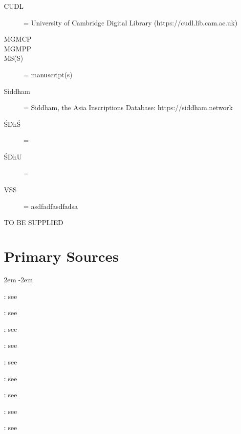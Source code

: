 \documentclass[11pt]{book}
\begin{document}
\begin{description}

\item[CUDL] = University of Cambridge Digital Library  
  (https://cudl.lib.cam.ac.uk)
  
\item[\fol]

\item[\fols]

\item[MGMCP]

\item[MGMPP]

\item[MS(S)] = manuscript(s)

\item[Siddham] = Siddham, the Asia Inscriptions Database:
https://siddham.network 

\item[ŚDhŚ] = \SDhS

\item[ŚDhU] = \SDhU
  
\item[VSS] = asdfadfasdfadsa
  
\end{description}


TO BE SUPPLIED

\vfill
\pagebreak



\section{Primary Sources}

\leftskip2em
\parindent-2em
\ 


: see 

: see \verify

: see \verify

: see 

: see 

: see 

: see \verify

: see \verify

: see \verify
\end{document}
